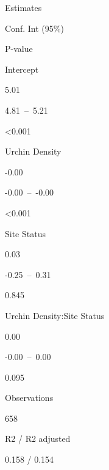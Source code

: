 \documentclass[
]{article}
\begin{document}
Estimates

Conf. Int (95\%)

P-value

Intercept

5.01

4.81~--~5.21

\textless0.001

Urchin Density

-0.00

-0.00~--~-0.00

\textless0.001

Site Status

0.03

-0.25~--~0.31

0.845

Urchin Density:Site Status

0.00

-0.00~--~0.00

0.095

Observations

658

R2 / R2 adjusted

0.158 / 0.154
\end{document}
